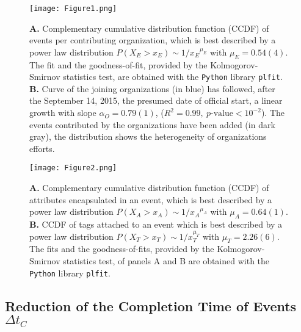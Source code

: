 \documentclass[unnumsec,webpdf,contemporary,large]{oup-authoring-template}%
\theoremstyle{thmstyleone}%
\theoremstyle{thmstyletwo}%
\theoremstyle{thmstylethree}%
\begin{document}
    \begin{figure}[ht]
    \centering
    \texttt{[image: Figure1.png]}
    \caption{{\bf A.} Complementary cumulative distribution function (CCDF) of events per contributing organization, which is best described by a power law distribution $P(X_E>x_E) \sim 1/{x_E}^{\mu_E}$ with $\mu_E = 0.54(4)$. The fit and the goodness-of-fit, provided by the Kolmogorov-Smirnov statistics test, are obtained with the \texttt{Python} library \texttt{plfit}. {\bf B.} Curve of the joining organizations (in blue) has followed, after the September 14, 2015, the presumed date of official start, a linear growth with slope $\alpha_O = 0.79(1)$, ($R^2 = 0.99,~p\textrm{-value} < 10^{-2}$). The events contributed by the organizations have been added (in dark gray), the distribution shows the heterogeneity of organizations efforts.} 
    \label{fig:org}
    \end{figure} 
    \begin{figure}[ht]
    \centering
    \texttt{[image: Figure2.png]}
    \caption{{\bf A.} Complementary cumulative distribution function (CCDF) of attributes encapsulated in an event, which is best described by a power law distribution $P(X_A>x_A) \sim 1/{x_A}^{\mu_A}$ with $\mu_A = 0.64(1)$. {\bf B.} CCDF of tags attached to an event which is best described by a power law distribution $P(X_T > x_T) \sim 1/x_T^{\mu_T}$ with $\mu_T = 2.26(6)$. The fits and the goodness-of-fits, provided by the Kolmogorov-Smirnov statistics test, of panels A and B are obtained with the \texttt{Python} library \texttt{plfit}.}
    \label{fig:CCDFs}
    \end{figure}
    
\subsection[Reduction of the Completion Time of Events \texorpdfstring{$\Delta t_C$}{\textDelta}]
  {Reduction of the Completion Time of Events $\Delta t_C$}
\end{document}
